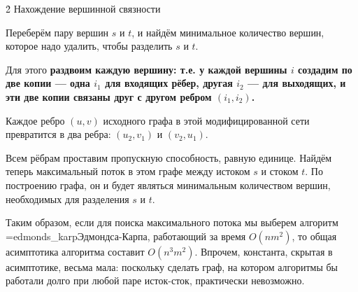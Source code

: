 \h2{ Нахождение вершинной связности }

Переберём пару вершин $s$ и $t$, и найдём минимальное количество вершин, которое надо удалить, чтобы разделить $s$ и $t$.

Для этого \bf{раздвоим} каждую вершину: т.е. у каждой вершины $i$ создадим по две копии --- одна $i_1$ для входящих рёбер, другая $i_2$ --- для выходящих, и эти две копии связаны друг с другом ребром $(i_1, i_2)$.

Каждое ребро $(u,v)$ исходного графа в этой модифицированной сети превратится в два ребра: $(u_2, v_1)$ и $(v_2, u_1)$.

Всем рёбрам проставим пропускную способность, равную единице. Найдём теперь максимальный поток в этом графе между истоком $s$ и стоком $t$. По построению графа, он и будет являться минимальным количеством вершин, необходимых для разделения $s$ и $t$.

Таким образом, если для поиска максимального потока мы выберем алгоритм \algohref=edmonds_karp{Эдмондса-Карпа}, работающий за время $O (n m^2)$, то общая асимптотика алгоритма составит $O (n^3 m^2)$. Впрочем, константа, скрытая в асимптотике, весьма мала: поскольку сделать граф, на котором алгоритмы бы работали долго при любой паре исток-сток, практически невозможно.

